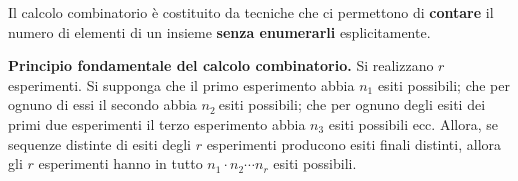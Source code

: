 Il calcolo combinatorio è costituito da tecniche che ci permettono di \textbf{contare} il numero di elementi di un insieme \textbf{senza enumerarli} esplicitamente.



\textbf{Principio fondamentale del calcolo combinatorio.} Si realizzano $r$ esperimenti. Si supponga che il primo esperimento abbia $n_{1}$ esiti possibili; che per ognuno di essi il secondo abbia $n_{2} \ $esiti possibili; che per ognuno degli esiti dei primi due esperimenti il terzo esperimento abbia $n_{3}$ esiti possibili ecc. Allora, se sequenze distinte di esiti degli $r$ esperimenti producono esiti finali distinti, allora gli $r$ esperimenti hanno in tutto $n_{1} \cdot n_{2} \cdots n_{r}$ esiti possibili.



